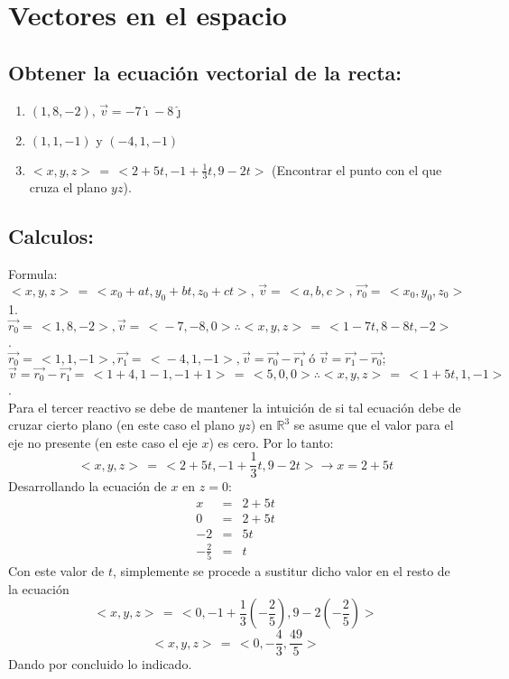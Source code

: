 \documentclass[letterpaper, 12pt]{article}
\begin{document}
    
\setcounter{page}{1}
\thispagestyle{fancy}
\section{Vectores en el espacio}
\subsection*{Obtener la ecuación vectorial de la recta:}
\begin{enumerate}
    \item \((1,8,-2),\,\vec{v}=-7\hat \imath-8\hat \jmath\)
    \item \((1,1,-1)\text{ y }(-4,1,-1)\)
    \item \(<\!x,y,z\!>\,=\,<\!2+5t,-1+\frac{1}{3}t,9-2t\!>\) (Encontrar el punto con el que cruza el plano \(yz\)).
\end{enumerate}
\subsection{Calculos:}
Formula: 
\[<\!x,y,z\!>\,=\,<\!x_0+at,y_0+bt,z_0+ct\!>,\,\vec{v}=\,<\!a,b,c\!>,\, \vec{r_0}=\,<\!x_0,y_0,z_0\!>\]
1.\\
\(\vec{r_0}=\,<\!1,8,-2\!>, \vec{v}=\,<\!-7,-8,0\!> \therefore <\!x,y,z\!>\,=\,<\!1-7t,8-8t,-2\!>\)\\ .\\
\(\vec{r_0}=\,<\!1,1,-1\!>, \vec{r_1}=\,<\!-4,1,-1\!>, \vec{v}=\vec{r_0}-\vec{r_1} \text{ ó } \vec{v}=\vec{r_1}-\vec{r_0};\)\\ \newline
\(\vec{v}=\vec{r_0}-\vec{r_1}=\,<\!1+4,1-1,-1+1\!>\,=\,<\!5,0,0\!>\therefore <\!x,y,z\!>\,=\,<\!1+5t,1,-1\!>\)\\ .\\
Para el tercer reactivo se debe de mantener la intuición de si tal ecuación debe de cruzar cierto plano (en este caso el plano \(yz\)) en \(\mathbb{R}^3\)
se asume que el valor para el eje no presente (en este caso el eje \(x\)) es cero. Por lo tanto:\\
\[<\!x,y,z\!>\,=\,<\!2+5t,-1+\frac{1}{3}t,9-2t\!> \rightarrow x=2+5t\]
Desarrollando la ecuación de \(x\) en \(z=0\):\\
\[\begin{matrix}
    x&=&2+5t\\
    0&=&2+5t\\
    -2&=&5t\\
    -\frac{2}{5}&=&t
\end{matrix}\]
Con este valor de \(t\), simplemente se procede a sustitur dicho valor en el resto de la ecuación
\[<\!x,y,z\!>\,=\,<\!0,-1+\frac{1}{3}\left(-\frac{2}{5}\right)\!,9-2\left(-\frac{2}{5}\right)\!>\]
\[<\!x,y,z\!>\,=\,<\!0,-\frac{4}{3},\frac{49}{5}\!>\]
Dando por concluido lo indicado.
\end{document}
